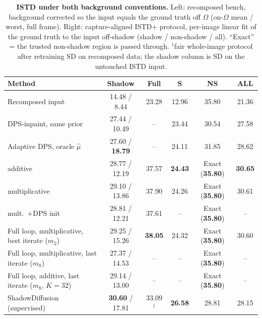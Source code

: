 \begin{table}[t]
    \centering
    \caption{
    \textbf{ISTD under both background conventions.}
    Left: recomposed bench, background corrected so the input equals the ground truth off $\Omega$ (on-$\Omega$ mean / worst, full frame). Right: capture-aligned ISTD$+$ protocol, per-image linear fit of the ground truth to the input off-shadow (shadow / non-shadow / all). ``Exact'' = the trusted non-shadow region is passed through. $^\dagger$fair whole-image protocol after retraining SD on recomposed data; the shadow column is SD on the untouched ISTD input.
    }
    \label{tab:shadow_istd_conventions}
    \small
    \setlength{\tabcolsep}{3.2pt}
    \renewcommand{\arraystretch}{1.08}
    \begin{tabular}{@{}lcc|ccc@{}}
        \toprule
        \textbf{Method} & \textbf{Shadow} & \textbf{Full} & \textbf{S} & \textbf{NS} & \textbf{ALL} \\
        \midrule
        Recomposed input & 14.48 / 8.44 & 23.28 & 12.96 & 35.80 & 21.36 \\
        DPS-inpaint, same prior & 27.44 / 10.49 & -- & 23.44 & 30.54 & 27.58 \\
        Adaptive DPS, oracle $\hat\mu$ & 27.60 / \textbf{18.79} & -- & 24.11 & 31.85 & 28.62 \\
        \methodmin{} additive & 28.77 / 12.19 & 37.57 & \textbf{24.43} & Exact (\textbf{35.80}) & \textbf{30.65} \\
        \methodmin{} multiplicative & 29.10 / 13.86 & 37.90 & 24.26 & Exact (\textbf{35.80}) & 30.61 \\
        \methodmin{} mult.\ $+$DPS init & 28.81 / 12.21 & 37.61 & -- & Exact (\textbf{35.80}) & -- \\
        Full loop, multiplicative, best iterate ($m_2$) & 29.25 / 15.26 & \textbf{38.05} & 24.32 & Exact (\textbf{35.80}) & 30.60 \\
        Full loop, multiplicative, last iterate ($m_8$) & 27.37 / 14.53 & -- & -- & Exact (\textbf{35.80}) & -- \\
        Full loop, additive, last iterate ($m_8$, $K{=}32$) & 29.14 / 13.00 & -- & -- & Exact (\textbf{35.80}) & -- \\
        \midrule
        ShadowDiffusion (supervised) & \textbf{30.60} / 17.81 & 33.09$^\dagger$ & \textbf{26.58} & 28.81 & 28.15 \\
        \bottomrule
    \end{tabular}
\end{table}

